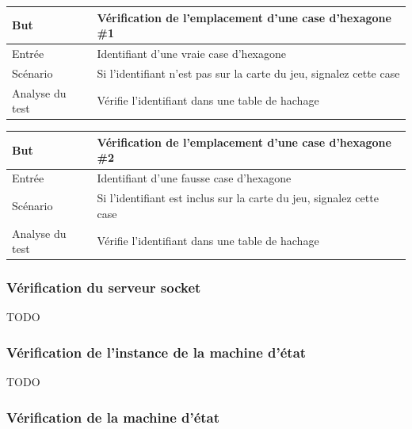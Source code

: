 \begin{center}
    \centering
    \begin{tabular}[h]{|m{4cm}|m{12cm}|} 
        \hline
        \rowcolor[HTML]{F8B400}
        \textbf{But} & Vérification de l'emplacement d'une case d'hexagone \#1\\
        \hline
        \hline
        \rowcolor[HTML]{F7F7F7}
        Entrée & Identifiant d'une vraie case d'hexagone \\
        \hline
        \rowcolor[HTML]{F7F7F7}
        Scénario & Si l'identifiant n'est pas sur la carte du jeu, signalez cette case\\
        \hline
        \rowcolor[HTML]{F7F7F7}
        Analyse du test & Vérifie l'identifiant dans une table de hachage \\
        \hline
    \end{tabular}
\end{center}

\begin{center}
    \centering
    \begin{tabular}[h]{|m{4cm}|m{12cm}|} 
        \hline
        \rowcolor[HTML]{F8B400}
        \textbf{But} & Vérification de l'emplacement d'une case d'hexagone \#2\\
        \hline
        \hline
        \rowcolor[HTML]{F7F7F7}
        Entrée & Identifiant d'une fausse case d'hexagone \\
        \hline
        \rowcolor[HTML]{F7F7F7}
        Scénario & Si l'identifiant est inclus sur la carte du jeu, signalez cette case\\
        \hline
        \rowcolor[HTML]{F7F7F7}
        Analyse du test & Vérifie l'identifiant dans une table de hachage \\
        \hline
    \end{tabular}
\end{center}

\subsubsection{Vérification du serveur socket}

TODO

\subsubsection{Vérification de l'instance de la machine d'état}

TODO

\subsubsection{Vérification de la machine d'état}

